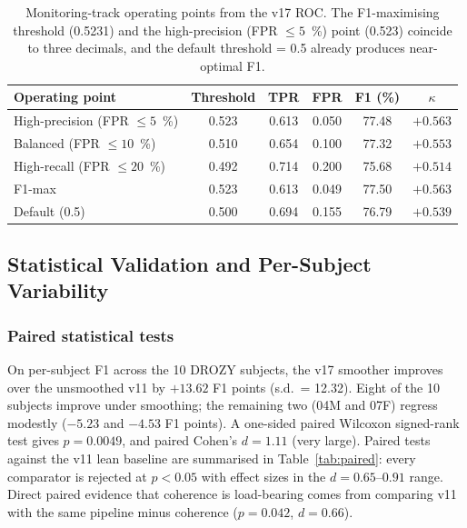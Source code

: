 \documentclass[journal]{IEEEtran}
\DeclareRobustCommand{\add}[1]{#1}                         %
\DeclareRobustCommand{\add}[1]{\hl{#1}}
\begin{document}
\begin{table}[t]
\caption{Monitoring-track operating points from the v17 ROC. The F1-maximising threshold (0.5231) and the high-precision (FPR \(\leq 5\)~\%) point (0.523) coincide to three decimals, and the default threshold = 0.5 already produces near-optimal F1.}
\label{tab:roc}
\centering
\small
\setlength{\tabcolsep}{4pt}
\begin{tabular}{l c c c c c}
\toprule
Operating point & Threshold & TPR & FPR & F1 (\%) & \(\kappa\) \\
\midrule
High-precision (FPR \(\leq 5\)~\%)  & 0.523 & 0.613 & 0.050 & 77.48 & \(+0.563\) \\
Balanced       (FPR \(\leq 10\)~\%) & 0.510 & 0.654 & 0.100 & 77.32 & \(+0.553\) \\
High-recall    (FPR \(\leq 20\)~\%) & 0.492 & 0.714 & 0.200 & 75.68 & \(+0.514\) \\
F1-max                              & 0.523 & 0.613 & 0.049 & 77.50 & \(+0.563\) \\
Default (0.5)                       & 0.500 & 0.694 & 0.155 & 76.79 & \(+0.539\) \\
\bottomrule
\end{tabular}
\end{table}

\subsection{\add{Statistical Validation and Per-Subject Variability}}
\label{sec:stats}

\subsubsection{Paired statistical tests}
\label{sec:paired}
On per-subject F1 across the 10 DROZY subjects, the v17 smoother improves over the unsmoothed v11 by \(+13.62\) F1 points (s.d.\ = 12.32). Eight of the 10 subjects improve under smoothing; the remaining two (04M and 07F) regress modestly (\(-5.23\) and \(-4.53\) F1 points). A one-sided paired Wilcoxon signed-rank test gives \(p = 0.0049\), and paired Cohen's \(d = 1.11\) (very large). Paired tests against the v11 lean baseline are summarised in Table~\ref{tab:paired}: every comparator is rejected at \(p < 0.05\) with effect sizes in the \(d = 0.65\)--\(0.91\) range. Direct paired evidence that coherence is load-bearing comes from comparing v11 with the same pipeline minus coherence (\(p = 0.042\), \(d = 0.66\)).
\end{document}
